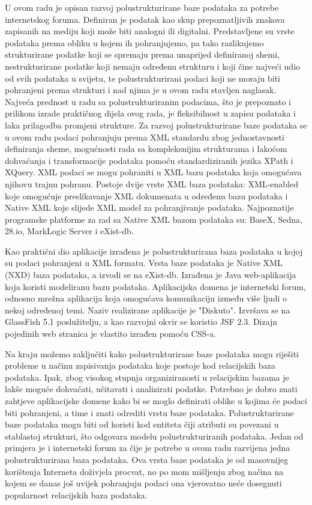 \documentclass{foi}
\begin{document}
U ovom radu je opisan razvoj polustrukturirane baze podataka za potrebe internetskog foruma. Definiran je podatak kao skup prepoznatljivih znakova zapisanih na mediju koji može biti analogni ili digitalni. Predstavljene su vrste podataka prema obliku u kojem ih pohranjujemo, pa tako razlikujemo strukturirane podatke koji se spremaju prema unaprijed definiranoj shemi, nestrukturirane podatke koji nemaju određenu strukturu i koji čine najveći udio od svih podataka u svijetu, te polustrukturirani podaci koji ne moraju biti pohranjeni prema strukturi i nad njima je u ovom radu stavljen naglasak. Najveća prednost u radu sa polustrukturiranim podacima, što je prepoznato i prilikom izrade praktičnog dijela ovog rada, je fleksibilnost u zapisu podataka i laka prilagodba promjeni strukture. Za razvoj polustrukturirane baze podataka se u ovom radu podaci pohranjuju prema XML standardu zbog jednostavnosti definiranja sheme, mogućnosti rada sa kompleksnijim strukturama i lakoćom dohvaćanja i transformacije podataka pomoću standardiziranih jezika XPath i XQuery. XML podaci se mogu pohraniti u XML bazu podataka koja omogućava njihovu trajnu pohranu. Postoje dvije vrste XML baza podataka: XML-enabled koje omogućuje preslikavanje XML dokumenata u određenu bazu podataka i Native XML koje slijede XML model za pohranjivanje podataka. Najpoznatije programske platforme za rad sa Native XML bazom podataka su: BaseX, Sedna, 28.io, MarkLogic Server i eXist-db.

Kao praktični dio aplikacije izrađena je polustrukturirana baza podataka u kojoj su podaci pohranjeni u XML formatu. Vrsta baze podataka je Native XML (NXD) baza podataka, a izvodi se na eXist-db. Izrađena je Java web-aplikacija koja koristi modeliranu bazu podataka. Aplikacijska domena je internetski forum, odnosno mrežna aplikacija koja omogućava komunikaciju između više ljudi o nekoj određenoj temi. Naziv realizirane aplikacije je "Diskuto". Izvršava se na GlassFish 5.1 poslužitelju, a kao razvojni okvir se koristio JSF 2.3. Dizajn pojedinih web stranica je vlastito izrađen pomoću CSS-a.

Na kraju možemo zaključiti kako polustrukturirane baze podataka mogu riješiti probleme u načinu zapisivanja podataka koje postoje kod relacijskih baza podataka. Ipak, zbog visokog stupnja organiziranosti u relacijskim bazama je lakše moguće dohvaćati, učitavati i analizirati podatke. Potrebno je dobro znati zahtjeve aplikacijske domene kako bi se moglo definirati oblike u kojima će podaci biti pohranjeni, a time i znati odrediti vrstu baze podataka. Polustrukturirane baze podataka mogu biti od koristi kod entiteta čiji atributi su povezani u stablastoj strukturi, što odgovara modelu polustrukturiranih podataka. Jedan od primjera je i internetski forum za čije je potrebe u ovom radu razvijena jedna polustrukturirana baza podataka. Ova vrsta baze podataka je od masovnijeg korištenja Interneta doživjela procvat, no po mom mišljenju zbog načina na kojem se danas još uvijek pohranjuju podaci ona vjerovatno neće dosegnuti popularnost relacijskih baza podataka.

\printbibliography[title=Popis literature]

\listoffigures
{}

\lstlistoflistings
{}
\end{document}
